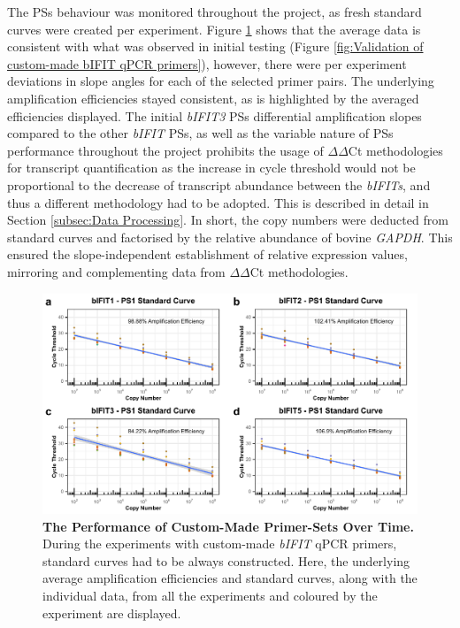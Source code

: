 The PSs behaviour was monitored throughout the project, as fresh standard curves were created per experiment. Figure \ref{fig:The Performance of Custom Made Primer Sets Over Time} shows that the average data is consistent with what was observed in initial testing (Figure \ref{fig:Validation of custom-made bIFIT qPCR primers}), however, there were per experiment deviations in slope angles for each of the selected primer pairs. The underlying amplification efficiencies stayed consistent, as is highlighted by the averaged efficiencies displayed. The initial \textit{bIFIT3} PSs differential amplification slopes compared to the other \textit{bIFIT} PSs, as well as the variable nature of PSs performance throughout the project prohibits the usage of \(\Delta\)\(\Delta\)Ct methodologies for transcript quantification as the increase in cycle threshold would not be proportional to the decrease of transcript abundance between the \textit{bIFITs}, and thus a different methodology had to be adopted. This is described in detail in Section \ref{subsec:Data Processing}. In short, the copy numbers were deducted from standard curves and factorised by the relative abundance of bovine \textit{GAPDH}. This ensured the slope-independent establishment of relative expression values, mirroring and complementing data from \(\Delta\)\(\Delta\)Ct methodologies.

\begin{figure}
    \centering
    \includegraphics[width=1\linewidth]{07. Chapter 2/Figs/01. Technologies/03. standard curves behaviour.pdf}
    \caption[The Performance of Custom-Made Primer-Sets Over Time.]{\textbf{The Performance of Custom-Made Primer-Sets Over Time.} During the experiments with custom-made \textit{bIFIT} qPCR primers, standard curves had to be always constructed. Here, the underlying average amplification efficiencies and standard curves, along with the individual data, from all the experiments and coloured by the experiment are displayed.}
    \label{fig:The Performance of Custom Made Primer Sets Over Time}
\end{figure}

